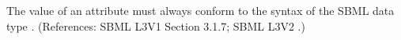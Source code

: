 The value of an  attribute must always conform to the syntax of
the SBML data type .  (References: SBML L3V1 Section 3.1.7; SBML L3V2
.)
